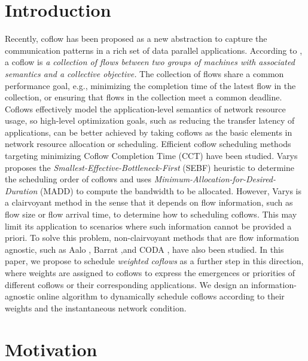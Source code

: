 \documentclass[10pt, conference, letterpaper]{IEEEtran}
\begin{document}
\section{Introduction}\label{introduction}

Recently, coflow has been proposed as a new abstraction to capture the communication patterns in a rich set of data parallel applications.
According to \cite{chowdhury2014efficient}, a coflow is {\em a collection of flows between two groups of machines with associated semantics and a collective objective.} The collection of flows share a common performance goal, e.g., minimizing the completion time of the latest flow in the collection, or ensuring that flows in the collection meet a common deadline. 
Coflows effectively model the application-level semantics of network resource usage, so high-level optimization goals, such as reducing the transfer latency of applications, can be better achieved by taking coflows as the basic elements in network resource allocation or scheduling.
Efficient coflow scheduling methods targeting minimizing Coflow Completion Time (CCT) have been studied. 
Varys \cite{chowdhury2014efficient} proposes the {\em Smallest-Effective-Bottleneck-First} (SEBF) heuristic to determine the scheduling order of coflows and uses {\em Minimum-Allocation-for-Desired-Duration} (MADD) to compute the bandwidth to be allocated. However, Varys is a clairvoyant method in the sense that it depends on flow information, such as flow size or flow arrival time, to determine how to scheduling coflows. This may limit its application to scenarios where such information cannot be provided a priori. To solve this problem, non-clairvoyant methods that are flow information agnostic, such as Aalo \cite{chowdhury2015efficient}, Barrat \cite{dogar2014decentralized},and CODA \cite{zhang2016coda}, have also been studied.
In this paper, we propose to schedule {\em weighted coflows} as a further step in this direction, where weights are assigned to coflows to express the emergences or priorities of different coflows or their corresponding applications. We design an information-agnostic online algorithm to dynamically schedule coflows according to their weights and the instantaneous network condition. 

\section{Motivation} \label{motivation}
\end{document}
